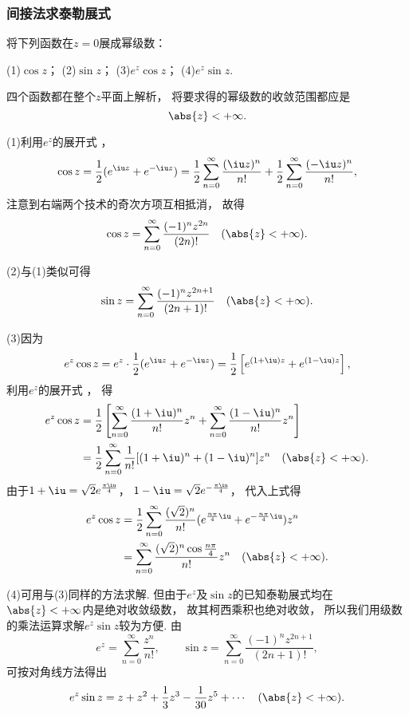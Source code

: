 \subsubsection{间接法求泰勒展式}
\begin{example}
将下列函数在\(z = 0\)展成幂级数：

(1)\(\cos z\)； \hfill (2)\(\sin z\)； \hfill (3)\(e^z \cos z\)； \hfill (4)\(e^z \sin z\).
\begin{solution}
四个函数都在整个\(z\)平面上解析，
将要求得的幂级数的收敛范围都应是\[
	\abs{z}<+\infty.
\]

(1)利用\(e^z\)的展开式 ，
\[
	\cos z = \frac{1}{2} (e^{\iu z} + e^{-\iu z})
	= \frac{1}{2} \sum_{n=0}^\infty \frac{(\iu z)^n}{n!} + \frac{1}{2} \sum_{n=0}^\infty \frac{(-\iu z)^n}{n!},
\]
注意到右端两个技术的奇次方项互相抵消，
故得\begin{equation}\label{equation:解析函数的级数表示.余弦函数的泰勒展式}
	\cos z = \sum_{n=0}^\infty \frac{(-1)^n z^{2n}}{(2n)!}
	\quad(\abs{z}<+\infty).
\end{equation}

(2)与(1)类似可得\begin{equation}\label{equation:解析函数的级数表示.正弦函数的泰勒展式}
	\sin z = \sum_{n=0}^\infty \frac{(-1)^n z^{2n+1}}{(2n+1)!}
	\quad(\abs{z}<+\infty).
\end{equation}

(3)因为\[
	e^z \cos z = e^z \cdot \frac{1}{2} (e^{\iu z} + e^{-\iu z})
	= \frac{1}{2} \left[e^{(1+\iu)z} + e^{(1-\iu)z}\right],
\]
利用\(e^z\)的展开式 ，
得\begin{align*}
	e^z \cos z
	&= \frac{1}{2} \left[
			\sum_{n=0}^\infty \frac{(1+\iu)^n}{n!} z^n
			+ \sum_{n=0}^\infty \frac{(1-\iu)^n}{n!} z^n
		\right] \\
	&= \frac{1}{2} \sum_{n=0}^\infty \frac{1}{n!} [(1+\iu)^n+(1-\iu)^n] z^n
	\quad(\abs{z}<+\infty).
\end{align*}
由于\(1+\iu=\sqrt{2} e^{\frac{\pi\iu}{4}}\)，
\(1-\iu=\sqrt{2} e^{-\frac{\pi\iu}{4}}\)，
代入上式得\begin{equation}
	\begin{split}
		e^z \cos z
		&= \frac{1}{2}
			\sum_{n=0}^\infty
			\frac{(\sqrt{2})^n}{n!}
			(e^{\frac{n\pi}{4}\iu}+e^{-\frac{n\pi}{4}\iu}) z^n \\
		&= \sum_{n=0}^\infty \frac{(\sqrt{2})^n \cos\frac{n\pi}{4}}{n!} z^n
		\quad(\abs{z}<+\infty).
	\end{split}
\end{equation}

(4)可用与(3)同样的方法求解.
但由于\(e^z\)及\(\sin z\)的已知泰勒展式均在\(\abs{z}<+\infty\)内是绝对收敛级数，
故其柯西乘积也绝对收敛，
所以我们用级数的乘法运算求解\(e^z \sin z\)较为方便.
由\[
	e^z = \sum_{n=0}^\infty \frac{z^n}{n!},
	\qquad
	\sin z = \sum_{n=0}^\infty \frac{(-1)^n z^{2n+1}}{(2n+1)!},
\]
可按对角线方法得出\[
	e^z \sin z
	= z + z^2 + \frac{1}{3} z^3 - \frac{1}{30} z^5 + \dotsb
	\quad(\abs{z}<+\infty).
\]
\end{solution}
\end{example}

